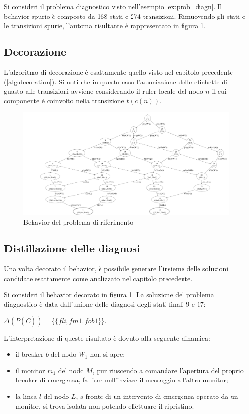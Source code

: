 \begin{ex}
Si consideri il problema diagnostico visto nell'esempio \ref{ex:prob_diagn}. Il behavior spurio è composto da  168 stati e 274 transizioni. Rimuovendo gli stati e le transizioni spurie, l'automa risultante è rappresentato in figura \ref{fig:bhv_c}.
\end{ex}

\subsection{Decorazione}
L'algoritmo di decorazione è esattamente quello visto nel capitolo precedente (\ref{alg:decoration}). Si noti che in questo caso l'associazione delle etichette di guasto alle transizioni avviene considerando il ruler locale del nodo $n$ il cui componente è coinvolto nella transizione $t(c(n))$. 

\begin{figure}[htbp]
\centering
\includegraphics[scale=0.1]{./Img/sac/behavior.png}
\caption{Behavior del problema di riferimento}
\label{fig:bhv_c}
\end{figure}

\subsection{Distillazione delle diagnosi}
Una volta decorato il behavior, è possibile generare l'insieme delle soluzioni candidate esattamente come analizzato nel capitolo precedente.

\begin{ex}
Si consideri il behavior decorato in figura \ref{fig:bhv_c}. La soluzione del problema diagnostico è data dall'unione delle diagnosi degli stati finali $9$ e $17$:
\begin{center}
$\Delta(P(\overline{C})) = \{\{fli,fm1,fob1\}\}$.
\end{center}
L'interpretazione di questo risultato è dovuto alla seguente dinamica:
\begin{itemize}
\item il breaker $b$ del nodo $W_1$ non si apre;
\item il monitor $m_1$ del nodo $M$, pur riuscendo a comandare l'apertura del proprio breaker di emergenza, fallisce nell'inviare il messaggio all'altro monitor;
\item la linea $l$ del nodo $L$, a fronte di un intervento di emergenza operato da un monitor, si trova isolata non potendo effettuare il ripristino.
\end{itemize}
\end{ex}

